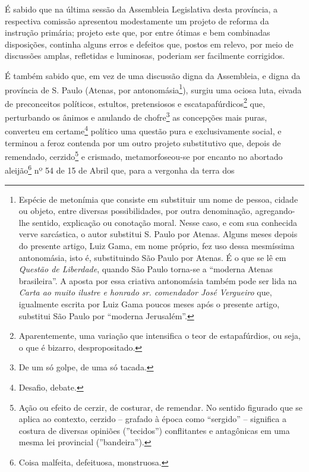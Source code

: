 É sabido que na última sessão da Assembleia Legislativa desta província,
a respectiva comissão apresentou modestamente um projeto de reforma da
instrução primária; projeto este que, por entre ótimas e bem combinadas
disposições, continha alguns erros e defeitos que, postos em relevo, por
meio de discussões amplas, refletidas e luminosas, poderiam ser
facilmente corrigidos.

É também sabido que, em vez de uma discussão digna da Assembleia, e
digna da província de S. Paulo (Atenas, por antonomásia\footnote{
  Espécie de metonímia que consiste em substituir um nome de pessoa,
  cidade ou objeto, entre diversas possibilidades, por outra
  denominação, agregando-lhe sentido, explicação ou conotação moral.
  Nesse caso, e com sua conhecida verve sarcástica, o autor substitui S.
  Paulo por Atenas. Alguns meses depois do presente artigo, Luiz Gama,
  em nome próprio, fez uso dessa mesmíssima antonomásia, isto é,
  substituindo São Paulo por Atenas. É o que se lê em \emph{Questão de
  Liberdade}, quando São Paulo torna-se a ``moderna Atenas brasileira''. A
  aposta por essa criativa antonomásia também pode ser lida na
  \emph{Carta ao muito ilustre e honrado sr. comendador José Vergueiro}
  que, igualmente escrita por Luiz Gama poucos meses após o presente
  artigo, substitui São Paulo por ``moderna Jerusalém''.}), surgiu uma
ociosa luta, eivada de preconceitos políticos, estultos, pretensiosos e
escatapafúrdicos\footnote{Aparentemente, uma variação que intensifica
  o teor de estapafúrdios, ou seja, o que é bizarro, despropositado.}
que, perturbando os ânimos e anulando de chofre\footnote{De um só
  golpe, de uma só tacada.} as concepções mais puras, converteu em
certame\footnote{Desafio, debate.} político uma questão pura e
exclusivamente social, e terminou a feroz contenda por um outro projeto
substitutivo que, depois de remendado, cerzido\footnote{Ação ou efeito
  de cerzir, de costurar, de remendar. No sentido figurado que se aplica
  ao contexto, cerzido -- grafado à época como ``sergido'' -- significa a
  costura de diversas opiniões (''tecidos'') conflitantes e antagônicas em
  uma mesma lei provincial (''bandeira'').} e crismado, metamorfoseou-se
por encanto no abortado aleijão\footnote{Coisa malfeita, defeituosa,
  monstruosa.} nº 54 de 15 de Abril que, para a vergonha da terra dos
